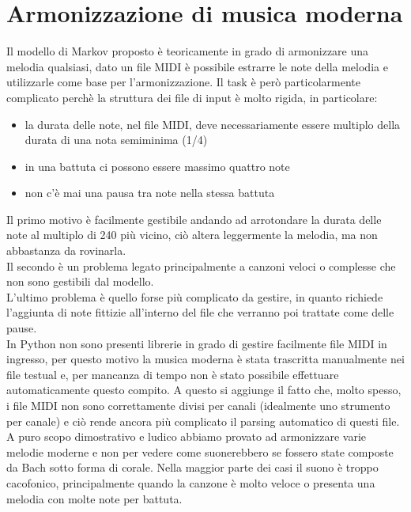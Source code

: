 \section{Armonizzazione di musica moderna}
Il modello di Markov proposto è teoricamente in grado di armonizzare una melodia qualsiasi, dato un file MIDI è possibile estrarre le note della melodia e utilizzarle come base per l'armonizzazione. Il task è però particolarmente complicato perchè la struttura dei file di input è molto rigida, in particolare:
\begin{itemize}
\item la durata delle note, nel file MIDI, deve necessariamente essere multiplo della durata di una nota semiminima (1/4)
\item in una battuta ci possono essere massimo quattro note
\item non c'è mai una pausa tra note nella stessa battuta
\end{itemize} 
Il primo motivo è facilmente gestibile andando ad arrotondare la durata delle note al multiplo di 240 più vicino, ciò altera leggermente la melodia, ma non abbastanza da rovinarla.\\
Il secondo è un problema legato principalmente a canzoni veloci o complesse che non sono gestibili dal modello. \\
L'ultimo problema è quello forse più complicato da gestire, in quanto richiede l'aggiunta di note fittizie all'interno del file che verranno poi trattate come delle pause.\\
In Python non sono presenti librerie in grado di gestire facilmente file MIDI in ingresso, per questo motivo la musica moderna è stata trascritta manualmente nei file testual e, per mancanza di tempo non è stato possibile effettuare automaticamente questo compito.
A questo si aggiunge il fatto che, molto spesso, i file MIDI non sono correttamente divisi per canali (idealmente uno strumento per canale) e ciò rende ancora più complicato il parsing automatico di questi file.\\
A puro scopo dimostrativo e ludico abbiamo provato ad armonizzare varie melodie moderne e non per vedere come suonerebbero se fossero state composte da Bach sotto forma di corale.
Nella maggior parte dei casi il suono è troppo cacofonico, principalmente quando la canzone è molto veloce o presenta una melodia con molte note per battuta.